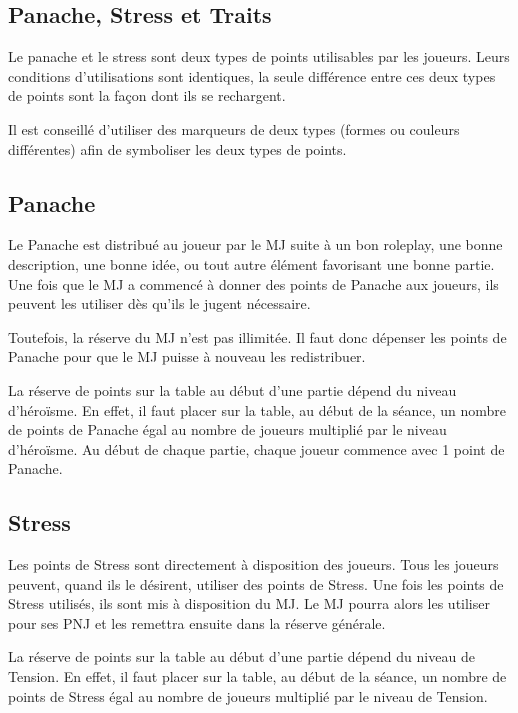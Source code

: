 \begin{multicols}{2}
\section{Panache, Stress et Traits}

Le panache et le stress sont deux types de points utilisables par les joueurs. Leurs conditions d'utilisations sont identiques, la seule différence entre ces deux types de points sont la façon dont ils se rechargent.

Il est conseillé d'utiliser des marqueurs de deux types (formes ou couleurs différentes) afin de symboliser les deux types de points.

\subsection{Panache}

Le Panache est distribué au joueur par le MJ suite à un bon roleplay, une bonne description, une bonne idée, ou tout autre élément favorisant une bonne partie. Une fois que le MJ a commencé à donner des points de Panache aux joueurs, ils peuvent les utiliser dès qu'ils le jugent nécessaire.

Toutefois, la réserve du MJ n'est pas illimitée. Il faut donc dépenser les points de Panache pour que le MJ puisse à nouveau les redistribuer. 

La réserve de points sur la table au début d'une partie dépend du niveau d'héroïsme. En effet, il faut placer sur la table, au début de la séance, un nombre de points de Panache égal au nombre de joueurs multiplié par le niveau d'héroïsme. Au début de chaque partie, chaque joueur commence avec 1 point de Panache.

\subsection{Stress}

Les points de Stress sont directement à disposition des joueurs. Tous les joueurs peuvent, quand ils le désirent, utiliser des points de Stress. Une fois les points de Stress utilisés, ils sont mis à disposition du MJ. Le MJ pourra alors les utiliser pour ses PNJ et les remettra ensuite dans la réserve générale.

La réserve de points sur la table au début d'une partie dépend du niveau de Tension. En effet, il faut placer sur la table, au début de la séance, un nombre de points de Stress égal au nombre de joueurs multiplié par le niveau de Tension.


\end{multicols}
